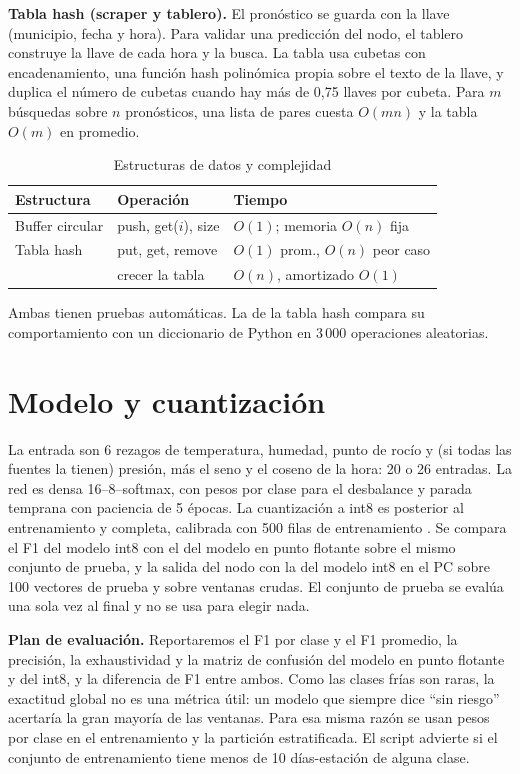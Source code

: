 \documentclass[conference]{IEEEtran}
\begin{document}
\textbf{Tabla hash (scraper y tablero).} El pron\'ostico se guarda con la llave (municipio, fecha y hora). Para validar una predicci\'on del nodo, el tablero construye la llave de cada hora y la busca. La tabla usa cubetas con encadenamiento, una funci\'on hash polin\'omica propia sobre el texto de la llave, y duplica el n\'umero de cubetas cuando hay m\'as de 0,75 llaves por cubeta. Para $m$ b\'usquedas sobre $n$ pron\'osticos, una lista de pares cuesta $O(mn)$ y la tabla $O(m)$ en promedio.

\begin{table}[t]
\caption{Estructuras de datos y complejidad}
\label{tab:ds}
\centering
\begin{tabular}{@{}lll@{}}
\toprule
Estructura & Operaci\'on & Tiempo \\
\midrule
Buffer circular & push, get($i$), size & $O(1)$; memoria $O(n)$ fija \\
Tabla hash & put, get, remove & $O(1)$ prom., $O(n)$ peor caso \\
 & crecer la tabla & $O(n)$, amortizado $O(1)$ \\
\bottomrule
\end{tabular}
\end{table}

Ambas tienen pruebas autom\'aticas. La de la tabla hash compara su comportamiento con un diccionario de Python en 3\,000 operaciones aleatorias.

\section{Modelo y cuantizaci\'on}
La entrada son 6 rezagos de temperatura, humedad, punto de roc\'io y (si todas las fuentes la tienen) presi\'on, m\'as el seno y el coseno de la hora: 20 o 26 entradas. La red es densa 16--8--softmax, con pesos por clase para el desbalance y parada temprana con paciencia de 5 \'epocas. La cuantizaci\'on a int8 es posterior al entrenamiento y completa, calibrada con 500 filas de entrenamiento \cite{jacob2018}. Se compara el F1 del modelo int8 con el del modelo en punto flotante sobre el mismo conjunto de prueba, y la salida del nodo con la del modelo int8 en el PC sobre 100 vectores de prueba y sobre ventanas crudas. El conjunto de prueba se eval\'ua una sola vez al final y no se usa para elegir nada.

\textbf{Plan de evaluaci\'on.} Reportaremos el F1 por clase y el F1 promedio, la precisi\'on, la exhaustividad y la matriz de confusi\'on del modelo en punto flotante y del int8, y la diferencia de F1 entre ambos. Como las clases fr\'ias son raras, la exactitud global no es una m\'etrica \'util: un modelo que siempre dice ``sin riesgo'' acertar\'ia la gran mayor\'ia de las ventanas. Para esa misma raz\'on se usan pesos por clase en el entrenamiento y la partici\'on estratificada. El script advierte si el conjunto de entrenamiento tiene menos de 10 d\'ias-estaci\'on de alguna clase.
\end{document}
